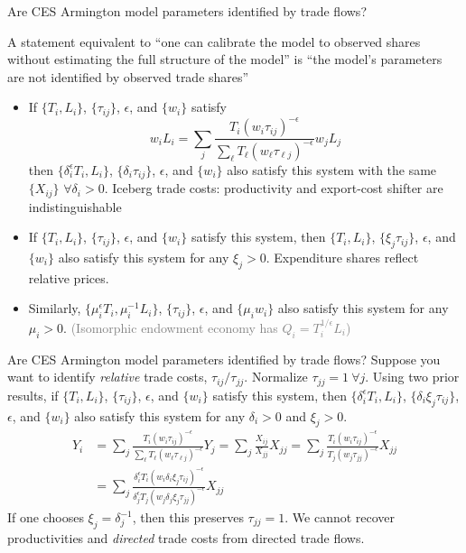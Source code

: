 \documentclass[11pt,notes=hide,aspectratio=169]{beamer}
\begin{document}
\begin{frame}{Are CES Armington model parameters identified by trade flows?}
{\small
A statement equivalent to
``one can calibrate the model to observed shares without estimating the full structure of the model''
is
``the model's parameters are not identified by observed trade shares''
\begin{itemize}
\item
If $\{T_i,L_i\}$, $\{\tau_{ij}\}$, $\epsilon$, and $\{w_i\}$ satisfy
$$
w_i L_i
=
\sum_j \frac{T_i \left(w_i \tau_{ij}\right)^{-\epsilon}}{\sum_{\ell} T_{\ell} \left(w_{\ell} \tau_{\ell j}\right)^{-\epsilon}}
w_j L_j
$$
then
$\{\delta_i^{\epsilon}T_i,L_i\}$, $\{\delta_i\tau_{ij}\}$, $\epsilon$, and $\{w_i\}$
also satisfy this system with the same $\{X_{ij}\}$
$\forall \delta_{i} > 0$.
Iceberg trade costs: productivity and export-cost shifter are indistinguishable
\item
If $\{T_i,L_i\}$, $\{\tau_{ij}\}$, $\epsilon$, and $\{w_i\}$ satisfy this system,
then
$\{T_i,L_i\}$, $\{\xi_j \tau_{ij}\}$, $\epsilon$, and $\{w_i\}$ 
also satisfy this system
for any $\xi_j > 0$.
Expenditure shares reflect relative prices.
\item
Similarly,
$\{\mu_{i}^{\epsilon}T_i,\mu_{i}^{-1} L_i\}$, $\{\tau_{ij}\}$, $\epsilon$, and $\{\mu_{i}w_i\}$
also satisfy this system
for any $\mu_{i} > 0$.
\textcolor{gray}{(Isomorphic endowment economy has $Q_i = T_i^{1/\epsilon} L_i$)}
\end{itemize}
}
\end{frame}
\begin{frame}{Are CES Armington model parameters identified by trade flows?}
Suppose you want to identify \textit{relative} trade costs, $\tau_{ij} / \tau_{jj}$.
Normalize $\tau_{jj} = 1 \ \forall j$.
\medskip
Using two prior results,
if $\{T_i,L_i\}$, $\{\tau_{ij}\}$, $\epsilon$, and $\{w_i\}$ satisfy this system,
then
$\{\delta_i^{\epsilon} T_i,L_i\}$, $\{\delta_i \xi_j \tau_{ij}\}$, $\epsilon$, and $\{w_i\}$
also satisfy this system
for any $\delta_{i} > 0$ and $\xi_j > 0$.
\begin{align*}
Y_i
&=
\sum_j \frac{T_i \left(w_i \tau_{ij}\right)^{-\epsilon}}{\sum_{\ell} T_{\ell} \left(w_{\ell} \tau_{\ell j}\right)^{-\epsilon}}
Y_j
=
\sum_j \frac{X_{ij}}{X_{jj}} 
X_{jj}
=
\sum_j \frac{T_i \left(w_i \tau_{ij}\right)^{-\epsilon}}{T_j \left(w_j \tau_{jj}\right)^{-\epsilon}}
X_{jj}
\\
&=
\sum_j \frac{\delta_i^{\epsilon}T_i \left(w_i \delta_i \xi_j\tau_{ij}\right)^{-\epsilon}}{\delta_j^{\epsilon}T_j \left(w_j \delta_j \xi_j \tau_{jj}\right)^{-\epsilon}}
X_{jj}
\end{align*}
If one chooses $\xi_j = \delta^{-1}_j$, then this preserves $\tau_{jj} = 1$.
\medskip
We cannot recover productivities and \textit{directed} trade costs from directed trade flows.
\end{frame}
\end{document}
